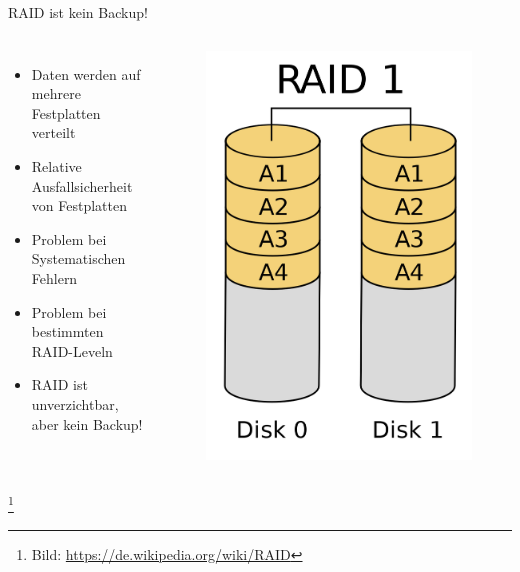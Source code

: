 \documentclass[10pt]{beamer}
\newcommand\blfootnote[1]{%
	\begingroup
	\renewcommand\thefootnote{}\footnote{#1}%
	\addtocounter{footnote}{-1}%
	\endgroup
}
\begin{document}
%
%
\begin{frame}[fragile]{RAID ist kein Backup!}
\begin{columns}[T,c,onlytextwidth]
	\begin{itemize}
		\item Daten werden auf mehrere Festplatten verteilt
		\item Relative Ausfallsicherheit von Festplatten
		\item Problem bei Systematischen Fehlern
		\item Problem bei bestimmten RAID-Leveln
		\item RAID ist unverzichtbar, aber kein Backup!
	\end{itemize}
	\begin{figure}
		\includegraphics[width=1\textwidth]{images/RAID_1}
	\end{figure}
\end{columns}
	\blfootnote{Bild: \href{https://de.wikipedia.org/wiki/RAID}{https://de.wikipedia.org/wiki/RAID}}
\end{frame}
\end{document}

